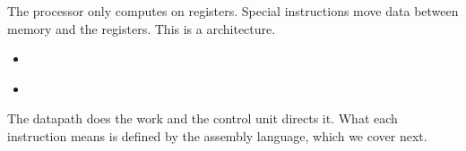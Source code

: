 \documentclass[mathserif, handout]{beamer}
\begin{document}
\begin{frame}
  The processor only computes on registers. Special instructions move data between memory and the registers. This is a  architecture.\\[3mm]
  \begin{itemize}
    \item {}  \\[2mm]
    \item {} 
  \end{itemize}
\end{frame}

\begin{frame}
  \begin{center}
    The datapath does the work and the control unit directs it. What each instruction means is defined by the assembly language, which we cover next.
  \end{center}
\end{frame}
\end{document}
